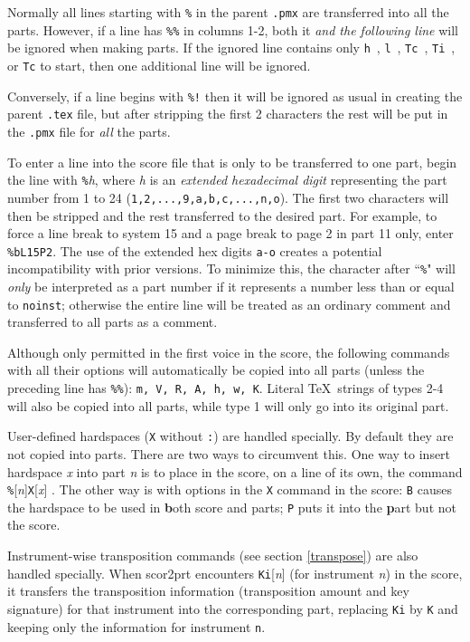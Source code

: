 \documentclass[11pt]{article}
\def\newfrom{2.59}  %
\def\NEW#1{\ifdim#1 pt<\newfrom pt\else%
\marginpar{\fbox{#1}}\fi}
\begin{document}
	Normally all lines starting with {\tt \%} in the parent {\tt .pmx} are 
transferred into all the parts.  However, if a line has {\tt \%\%} in 
columns 1-2, both it {\it and the following line} will be ignored when 
making parts.  If the ignored line contains only {\tt h}~, {\tt l}~,
 {\tt Tc}~, {\tt Ti}~, or {\tt Tc} to start, 
then one additional line will be ignored.  

	Conversely, if a line begins with {\tt \%!} then it will be ignored as 
usual in creating the parent {\tt .tex} file, but after stripping the first 
2 characters the rest will be put in the {\tt .pmx} file for {\it all} the 
parts.  

To enter a line into the score file that is only to be transferred to one part,
begin the line with \NEW{2.6} {\tt\%}{\it h}, where {\it h} is an {\it extended
hexadecimal digit} representing the part number from 1 to 24 
({\tt1,2,...,9,a,b,c,...,n,o}).  The first 
two characters will then be stripped and the rest transferred to the desired part.
For example, to force a line break to system 15 and a page 
break to page 2 in part 11 only, enter {\tt \%bL15P2}. The use of the extended hex 
digits {\tt a-o} creates a potential incompatibility with prior versions.  
To minimize this, the
character after ``{\tt\%}" will {\it only} be interpreted as a part number if 
it represents a number less than or equal to {\tt noinst}; otherwise the entire
line will be treated as an ordinary comment and transferred to all parts as
a comment.  

	Although only permitted in the first voice in the score, the 
following commands with all their options will automatically be copied 
into all parts (unless the preceding line has {\tt \%\%}):
 {\tt m, V, R, A, h, w, K}.  Literal \TeX\ strings of types 2-4 will also be 
copied into all parts, while type 1 will only go into its original part.

User-defined hardspaces ({\tt X} without {\tt :}) are handled specially.  By
default they are not copied into parts.  There are two ways to circumvent this.
One way to insert hardspace {\it x} into part 
{\it n} is to place in the score, on a line of its own, the command 
{\tt\%}[{\it n}]{\tt X}[{\it x}] .  The \NEW{1.42} other way is with options 
in the {\tt X} command in the score: {\tt B} causes the hardspace to be
used in {\bf b}oth score and parts; {\tt P} puts it into the {\bf p}art but not
the score.

Instrument-wise \NEW{2.7} transposition commands (see section \ref{transpose})
are also handled specially. 
When {\bfx scor2prt} encounters {\tt Ki}[{\it n}] (for instrument {\it n}) in
the score, it transfers the transposition information (transposition amount and 
key signature) for that instrument into
the corresponding part, replacing {\tt Ki} by {\tt K} and keeping only the 
information for instrument {\tt n}.
\end{document}
